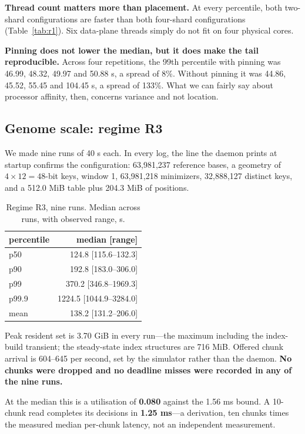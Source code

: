 \documentclass[conference]{IEEEtran}
\begin{document}
\textbf{Thread count matters more than placement.} At every percentile, both two-shard
configurations are faster than both four-shard configurations (Table~\ref{tab:r1}). Six
data-plane threads simply do not fit on four physical cores.

\textbf{Pinning does not lower the median, but it does make the tail reproducible.} Across four
repetitions, the 99th percentile with pinning was 46.99, 48.32, 49.97 and 50.88 \textmu{}s, a
spread of 8\%. Without pinning it was 44.86, 45.52, 55.45 and 104.45 \textmu{}s, a spread of
133\%. What we can fairly say about processor affinity, then, concerns variance and not
location.

\subsection{Genome scale: regime R3}

We made nine runs of 40 s each. In every log, the line the daemon prints at startup confirms the
configuration: 63,981,237 reference bases, a geometry of $4 \times 12 = 48$-bit keys, window 1,
63,981,218 minimizers, 32,888,127 distinct keys, and a 512.0 MiB table plus 204.3 MiB of
positions.

\begin{table}[t]
\caption{Regime R3, nine runs. Median across runs, with observed range, \textmu{}s.}
\label{tab:r3}
\centering
\footnotesize
\begin{tabular}{lr}
\toprule
percentile & median [range] \\
\midrule
p50   & 124.8 [115.6--132.3] \\
p90   & 192.8 [183.0--306.0] \\
p99   & 370.2 [346.8--1969.3] \\
p99.9 & 1224.5 [1044.9--3284.0] \\
mean  & 138.2 [131.2--206.0] \\
\bottomrule
\end{tabular}
\end{table}

Peak resident set is 3.70 GiB in every run---the maximum including the index-build transient;
the steady-state index structures are 716 MiB. Offered chunk arrival is 604--645 per second, set
by the simulator rather than the daemon. \textbf{No chunks were dropped and no deadline misses
were recorded in any of the nine runs.}

At the median this is a utilisation of \textbf{0.080} against the 1.56 ms bound. A 10-chunk read
completes its decisions in \textbf{1.25 ms}---a derivation, ten chunks times the measured median
per-chunk latency, not an independent measurement.
\end{document}
